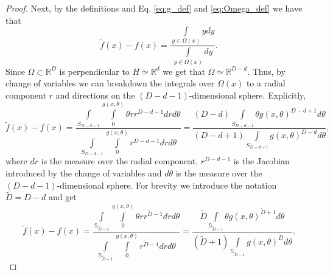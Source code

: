 \documentclass[12pt]{article}
\theoremstyle{remark}
\newcommand{\RR}{\mathbb{R}}
\newcommand{\wtilde}[1]{\widetilde{#1}}
\begin{document}
\begin{appendices}
\begin{proof}
Next, by the definitions and Eq. \eqref{eq:g_def} and \eqref{eq:Omega_def} we have that 
\begin{equation*}
\wtilde{f}(x) - f(x) = \frac{\int\limits_{y\in\Omega(x)} y dy}{\int\limits_{y\in\Omega(x)} dy} 
.\end{equation*}
Since $\Omega \subset \RR^D$ is perpendicular to $H\simeq \RR^d$ we get that $\Omega\simeq \RR^{D-d}$.
Thus, by change of variables we can breakdown the integrals over $\Omega(x)$ to a radial component $r$ and directions on the $(D-d-1)$-dimensional sphere.
Explicitly,
\begin{equation*}
\wtilde{f}(x) - f(x) = 
\frac{\int\limits_{S_{D-d-1}}\int\limits_0^{g(x,\theta)} \theta r r^{D-d-1} drd\theta}{\int\limits_{S_{D-d-1}}\int\limits_0^{g(x,\theta)} r^{D-d-1} drd\theta}  = 
\frac{(D-d)\int\limits_{S_{D-d-1}}\theta g(x,\theta)^{D-d+1} d\theta}{(D-d+1)\int\limits_{S_{D-d-1}}g(x,\theta)^{D-d} d\theta}     
,\end{equation*}
where $dr$ is the measure over the radial component, $r^{D-d-1}$ is the Jacobian introduced by the change of variables and $d\theta$ is the measure over the $(D-d-1)$-dimensional sphere.
For brevity we introduce the notation $\wtilde D = D - d$ and get
\begin{equation}\label{eq:f_tilde-f_integrals}
\wtilde{f}(x) - f(x) = 
\frac{\int\limits_{\mathbb{S}_{\wtilde D-1}}\int\limits_0^{g(x,\theta)} \theta r r^{\wtilde D-1} drd\theta}{\int\limits_{\mathbb{S}_{\wtilde D-1}}\int\limits_0^{g(x,\theta)} r^{\wtilde D-1} drd\theta}  = 
\frac{\wtilde D \int\limits_{\mathbb{S}_{\wtilde D-1}}\theta g(x,\theta)^{\wtilde D+1} d\theta}{(\wtilde D+1)\int\limits_{\mathbb{S}_{\wtilde D-1}}g(x,\theta)^{\wtilde D} d\theta}     
.\end{equation}
 

\end{proof}
\end{appendices}
\end{document}
